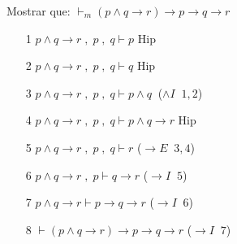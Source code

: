 \documentclass[11pt,letterpaper]{article}
\begin{document}
\bi
\item Mostrar que: \hspace{0.5cm} $\vdash_m (p \wedge q \rightarrow r) 
\rightarrow p \rightarrow q \rightarrow r$  %
\begin{enumerate}
\item[1] $ p \wedge q \rightarrow r \; , \; p \; , \; q \vdash p $ \hspace{2cm} 
Hip
\item[2] $ p \wedge q \rightarrow r \; , \; p \; , \; q \vdash q $ \hspace{2cm} 
Hip
\item[3] $ p \wedge q \rightarrow r \; , \; p \; , \; q \vdash p \wedge q \ $ 
\hspace{1.25cm} ($ \wedge I \;\; 1,2$)
\item[4] $ p \wedge q \rightarrow r \; , \; p \; , \; q \vdash p \wedge q 
\rightarrow r $ \hspace{0.6cm} Hip
\item[5] $ p \wedge q \rightarrow r \; , \; p \; , \; q \vdash  r $ 
\hspace{2.05cm} ($\rightarrow E \;\; 3,4 $)
\item[6] $ p \wedge q \rightarrow r \; , \; p  \vdash q \rightarrow r $ 
\hspace{1.85cm}  ($\rightarrow I \;\; 5 $)
\item[7] $ p \wedge q \rightarrow r  \vdash p \rightarrow q \rightarrow r $ 
\hspace{1.65cm} ($\rightarrow I \;\; 6 $)
\item[8] $  \vdash (p \wedge q \rightarrow r) \rightarrow p \rightarrow q 
\rightarrow r $ \hspace{1.2cm} ($\rightarrow I \;\; 7 $)
\end{enumerate}
\end{document}
